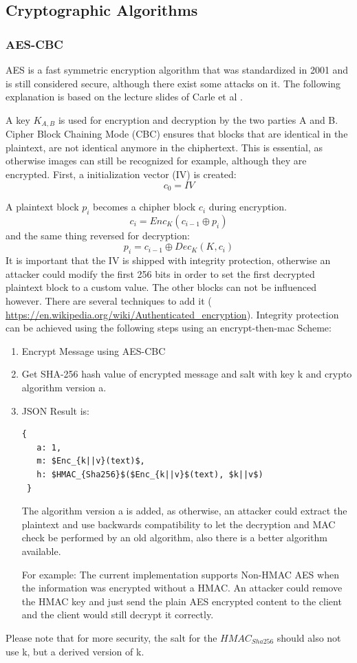 \documentclass{scrartcl}
\begin{document}
 
\subsection{Cryptographic Algorithms}
\subsubsection{AES-CBC \label{AESCBC}}
AES is a fast symmetric encryption algorithm that was standardized in 2001 and is still considered secure, although there exist some attacks on it. The following explanation is based on the lecture slides of Carle et al \cite{carle}.

A key $K_{A,B}$ is used for encryption and decryption by the two parties A and B. 
Cipher Block Chaining Mode (CBC) ensures that blocks that are identical in the plaintext, are not identical anymore in the chiphertext. This is essential, as otherwise images can still be recognized for example, although they are encrypted. First, a initialization vector (IV) is created:
$$
c_0 = IV
$$

A plaintext block $p_i$ becomes a chipher block $c_i$ during encryption.
$$
c_i = Enc_K(c_{i-1} \oplus p_i)
$$
and the same thing reversed for decryption:
$$
p_i = c_{i-1} \oplus Dec_K(K, c_i)
$$
It is important that the IV is shipped with integrity protection, otherwise an attacker could modify the first 256 bits in order to set the first decrypted plaintext block to a custom value. The other blocks can not be influenced however. 
There are several techniques to add it (
\url{https://en.wikipedia.org/wiki/Authenticated_encryption}).
 Integrity protection can be achieved using the following steps using an encrypt-then-mac Scheme:
\begin{enumerate}
\item Encrypt Message using AES-CBC
\item Get SHA-256 hash value of encrypted message and salt with key k and crypto algorithm version a.
\item JSON Result is:
\begin{lstlisting}[mathescape]
 { 
   a: 1,
   m: $Enc_{k||v}(text)$,
   h: $HMAC_{Sha256}$($Enc_{k||v}$(text), $k||v$)
 }
 \end{lstlisting}
  The algorithm version a is added, as otherwise, an attacker could extract the plaintext and use backwards compatibility to let the decryption and MAC check be performed by an old algorithm, also there is a better algorithm available.

For example: The current implementation supports Non-HMAC AES when the information was encrypted without a HMAC. An attacker could remove the HMAC key and just send the plain AES encrypted content to the client and the client would still decrypt it correctly.

\end{enumerate}
Please note that for more security, the salt for the $HMAC_{Sha256}$ should also not use k, but a derived version of k.
\end{document}
